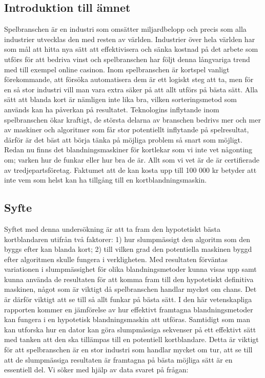 \documentclass[a4paper]{article}
\begin{document}
\subsection{Introduktion till ämnet}

Spelbranschen är en industri som omsätter miljardbelopp och precis som alla
industrier utvecklas den med resten av världen. Industrier över hela världen har
som mål att hitta nya sätt att effektivisera och sänka kostnad på det arbete som
utförs för att bedriva vinst och spelbranschen har följt denna långvariga trend
med till exempel online casinon. Inom spelbranschen är kortspel vanligt
förekommande, att försöka automatisera dem är ett logiskt steg att ta, men för
en så stor industri vill man vara extra säker på att allt utförs på bästa sätt.
Alla sätt att blanda kort är nämligen inte lika bra, vilken sorteringsmetod som
används kan ha påverkan på resultatet. Teknologins inflytande inom spelbranschen
ökar kraftigt, de största delarna av branschen bedrivs mer och mer av maskiner
och algoritmer som får stor potentiellt inflytande på spelresultat, därför är
det bäst att börja tänka på möjliga problem så snart som möjligt. Redan nu finns
det blandningsmaskiner för kortlekar som vi inte vet någonting om; varken hur de
funkar eller hur bra de är. Allt som vi vet är de är certifierade av
tredjepartsföretag. Faktumet att de kan kosta upp till 100 000 kr betyder att
inte vem som helst kan ha tillgång till en kortblandningsmaskin.

\subsection{Syfte}

Syftet med denna undersökning är att ta fram den hypotetiskt bästa kortblandaren
utifrån två faktorer: 1) hur slumpmässigt den algoritm som den byggs efter kan
blanda kort; 2) till vilken grad den potentiella maskinen byggd efter algoritmen
skulle fungera i verkligheten. Med resultaten förväntas variationen i
slumpmässighet för olika blandningsmetoder kunna visas upp samt kunna använda de
resultaten för att komma fram till den hypotetiskt definitiva maskinen, något
som är viktigt då spelbranschen handlar mycket om chans. Det är därför viktigt
att se till så allt funkar på bästa sätt. I den här vetenskapliga rapporten
kommer en jämförelse av hur effektivt framtagna blandningsmetoder kan fungera i
en hypotetisk blandningsmaskin att utföras. Samtidigt som man kan utforska hur
en dator kan göra slumpmässiga sekvenser på ett effektivt sätt med tanken att
den ska tillämpas till en potentiell kortblandare. Detta är viktigt för att
spelbranschen är en stor industri som handlar mycket om tur, att se till att de
slumpmässiga resultaten är framtagna på bästa möjliga sätt är en essentiell del.
Vi söker med hjälp av data svaret på frågan:
\end{document}
